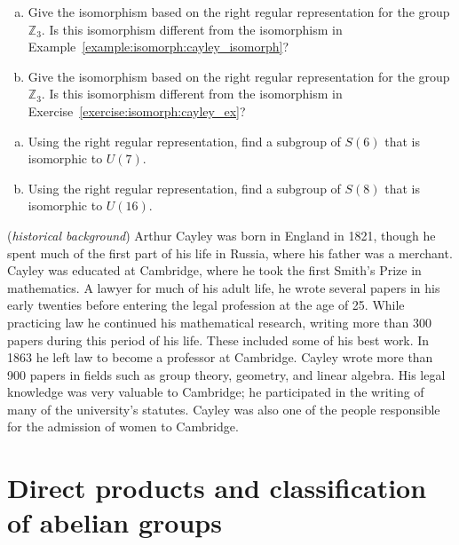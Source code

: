 \begin{exercise}{}
\begin{enumerate}[(a)]
\item
Give the isomorphism  based on the right regular representation for the group $\mathbb{Z}_3$.  Is this isomorphism different from the isomorphism in Example~\ref{example:isomorph:cayley_isomorph}?
\item
Give the isomorphism  based on the right regular representation for the group $\mathbb{Z}_3$.  Is this isomorphism different from the isomorphism in Exercise~\ref{exercise:isomorph:cayley_ex}?
\end{enumerate}
\end{exercise}


\begin{exercise}{}
\begin{enumerate}[(a)]
\item
Using the right regular representation, find a subgroup of $S(6)$ that is isomorphic to $U(7)$.
\item
Using the right regular representation, find a subgroup of $S(8)$ that is isomorphic to $U(16)$.
\end{enumerate}
\end{exercise}

\begin{rem} (\emph{historical background})  Arthur Cayley was born in England in 1821, though he spent much of the first part of his life in Russia, where his father was a merchant.  Cayley was educated at Cambridge, where he took the first Smith's Prize in mathematics.  A lawyer for much of his adult life, he wrote several papers in his early twenties before entering the legal profession at the age of 25.  While practicing law he continued his mathematical research, writing more than 300 papers during this period of his life.  These included some of his best work.  In 1863 he left law to become a professor at Cambridge.  Cayley wrote more than 900 papers in fields such as group theory, geometry, and linear algebra. His legal knowledge was very valuable to Cambridge; he participated in the writing of many of the university's statutes.  Cayley was also one of the people responsible for the admission of women to Cambridge. 
\end{rem} 

\section{Direct products and classification of abelian groups\quad
{}}
\label{sec:DirectProductsClassificationAbelianGroups}


